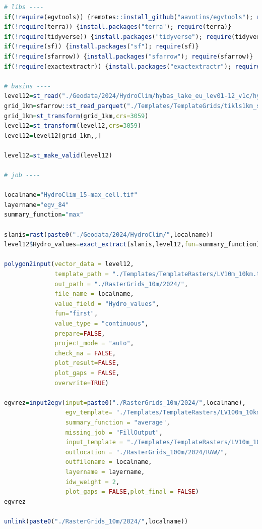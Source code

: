 \documentclass[
]{book}
\begin{document}
\begin{lstlisting}[language=R]
# libs ----
if(!require(egvtools)) {remotes::install_github("aavotins/egvtools"); require(egvtools)}
if(!require(terra)) {install.packages("terra"); require(terra)}
if(!require(tidyverse)) {install.packages("tidyverse"); require(tidyverse)}
if(!require(sf)) {install.packages("sf"); require(sf)}
if(!require(sfarrow)) {install.packages("sfarrow"); require(sfarrow)}
if(!require(exactextractr)) {install.packages("exactextractr"); require(exactextractr)}

# basins ----
level12=st_read("./Geodata/2024/HydroClim/hybas_lake_eu_lev01-12_v1c/hybas_lake_eu_lev12_v1c.shp")
grid_1km=sfarrow::st_read_parquet("./Templates/TemplateGrids/tikls1km_sauzeme.parquet")
grid_1km=st_transform(grid_1km,crs=3059)
level12=st_transform(level12,crs=3059)
level12=level12[grid_1km,,]

level12=st_make_valid(level12)

# job ----

localname="HydroClim_15-max_cell.tif"
layername="egv_84"
summary_function="max"
  
slanis=rast(paste0("./Geodata/2024/HydroClim/",localname))
level12$Hydro_values=exact_extract(slanis,level12,fun=summary_function)
  
polygon2input(vector_data = level12,
              template_path = "./Templates/TemplateRasters/LV10m_10km.tif",
              out_path = "./RasterGrids_10m/2024/",
              file_name = localname,
              value_field = "Hydro_values",
              fun="first",
              value_type = "continuous",
              prepare=FALSE,
              project_mode = "auto",
              check_na = FALSE,
              plot_result=FALSE,
              plot_gaps = FALSE,
              overwrite=TRUE)
  
egvrez=input2egv(input=paste0("./RasterGrids_10m/2024/",localname),
                 egv_template= "./Templates/TemplateRasters/LV100m_10km.tif",
                 summary_function = "average",
                 missing_job = "FillOutput",
                 input_template = "./Templates/TemplateRasters/LV10m_10km.tif",
                 outlocation = "./RasterGrids_100m/2024/RAW/",
                 outfilename = localname,
                 layername = layername,
                 idw_weight = 2,
                 plot_gaps = FALSE,plot_final = FALSE)
egvrez
  
unlink(paste0("./RasterGrids_10m/2024/",localname))
\end{lstlisting}
\end{document}

